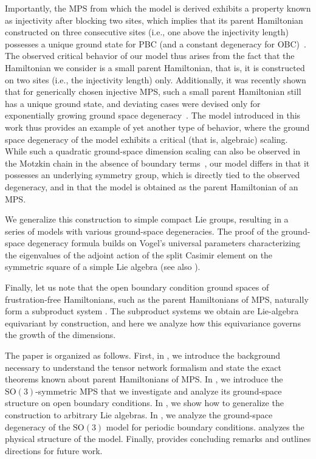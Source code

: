 \documentclass[a4paper]{article}
\newcommand{\SO}{\mathrm{SO}}
\theoremstyle{definition}
\begin{document}
Importantly, the MPS from which the model is derived exhibits a property
known as injectivity after blocking two sites, which implies that its parent
Hamiltonian constructed on three consecutive sites (i.e., one above the
injectivity length) possesses a unique ground state for PBC (and a constant
degeneracy for OBC)~\cite{Perez-Garcia2007}.  The observed critical behavior
of our model
thus arises from the fact that the Hamiltonian we consider is a small parent
Hamiltonian, that is, it is constructed on two sites (i.e., the injectivity length) only. Additionally, it was
recently shown that for  generically chosen injective MPS, such a small parent
Hamiltonian still has a unique ground state, and deviating cases were devised only
for exponentially growing ground space degeneracy~\cite{schuch2025}. The model
introduced in this work thus provides an example of yet another type of behavior, where
the ground space degeneracy of the model exhibits a critical (that is,
algebraic) scaling. While  such a quadratic ground-space dimension scaling can
also be observed in the Motzkin chain in the absence of boundary
terms~\cite{Movassagh2014}, our model differs in that it possesses an underlying
symmetry group, which is directly tied to the observed degeneracy, and in that
the model is obtained as the parent Hamiltonian of an MPS.


We generalize this construction to simple compact Lie groups, resulting in a series of models with various ground-space degeneracies. The proof of the ground-space degeneracy formula builds on Vogel's universal parameters characterizing the eigenvalues of the adjoint action of the split Casimir element on the symmetric square of a simple Lie algebra \cite{vogel1999} (see also \cite{isaev2026vogel}).


Finally, let us note that the open boundary condition ground spaces of frustration-free Hamiltonians, such as the parent Hamiltonians of MPS, naturally form a subproduct system \cite{ShalitSolel2009}. The subproduct systems we obtain are Lie-algebra equivariant by construction, and here we analyze how this equivariance governs the growth of the dimensions.


The paper is organized as follows. First, in , we introduce the background necessary to understand the tensor network formalism and state the exact theorems known about parent Hamiltonians of MPS. In , we introduce the $\SO(3)$-symmetric MPS that we investigate and analyze its ground-space structure on open boundary conditions. In , we show how to generalize the construction to arbitrary Lie algebras. In , we analyze the ground-space degeneracy of the $\SO(3)$ model for periodic boundary conditions.  analyzes the physical structure of the model. Finally,  provides concluding remarks and outlines directions for future work.
\end{document}
